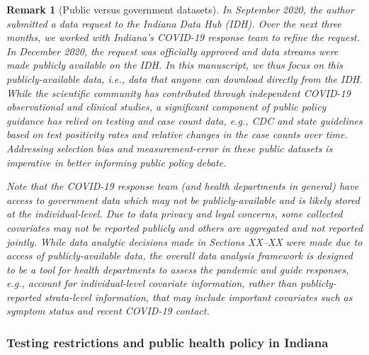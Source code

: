 \documentclass[11pt]{amsart}
\numberwithin{equation}{section}
\theoremstyle{plain}
\newtheorem{remark}{Remark}
\begin{document}
\begin{remark}[Public versus government datasets]
In September 2020, the author submitted a data request to the Indiana Data Hub (IDH).  Over the next three months, we worked with Indiana's COVID-19 response team to refine the request.  In December 2020, the request was officially approved and data streams were made publicly available on the IDH.  In this manuscript, we thus focus on this \emph{publicly-available data}, i.e., data  that anyone can download directly from the IDH. While the scientific community has contributed through independent COVID-19 observational and clinical studies, a significant component of public policy guidance has relied on testing and case count data, e.g., CDC and state guidelines based on test positivity rates and relative changes in the case counts over time.   Addressing selection bias and measurement-error in these public datasets is imperative in better informing public policy debate.

Note that the COVID-19 response team (and health departments in general) have access to \emph{government data} which may not be publicly-available and is likely stored at the individual-level. Due to data privacy and legal concerns, some collected covariates may not be reported publicly and others are aggregated and not reported jointly.  While data analytic decisions made in Sections XX--XX were made due to access of publicly-available data, the overall data analysis framework is designed to be a tool for health departments to assess the pandemic and guide responses, e.g.,  account for individual-level covariate information, rather than publicly-reported strata-level information, that may include important covariates such as symptom status and recent COVID-19 contact.
 \end{remark}


 \subsubsection{Testing restrictions and public health policy in Indiana}
 \label{section:publicpolicyindiana}
\end{document}
